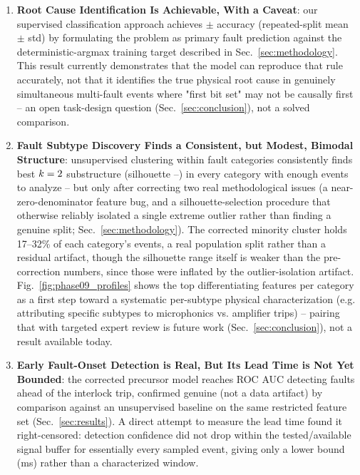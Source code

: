 \begin{enumerate}
    \item \textbf{Root Cause Identification Is Achievable, With a Caveat}: our supervised classification approach achieves \MetricZeroEightPhaseThreeaRootcauseStabilityAccuracyMean$\pm$\MetricZeroEightPhaseThreeaRootcauseStabilityAccuracyStd{} accuracy (repeated-split mean $\pm$ std) by formulating the problem as primary fault prediction against the deterministic-argmax training target described in Sec.~\ref{sec:methodology}. This result currently demonstrates that the model can reproduce that rule accurately, not that it identifies the true physical root cause in genuinely simultaneous multi-fault events where "first bit set" may not be causally first -- an open task-design question (Sec.~\ref{sec:conclusion}), not a solved comparison.

    \item \textbf{Fault Subtype Discovery Finds a Consistent, but Modest, Bimodal Structure}: unsupervised clustering within fault categories consistently finds best $k=2$ substructure (silhouette \MetricZeroNinecEnhancedSubclassDiscoveryCavityQuenchBreakdownSilhouette--\MetricZeroNinecEnhancedSubclassDiscoveryVacuumThresholdSilhouette) in every category with enough events to analyze -- but only after correcting two real methodological issues (a near-zero-denominator feature bug, and a silhouette-selection procedure that otherwise reliably isolated a single extreme outlier rather than finding a genuine split; Sec.~\ref{sec:methodology}). The corrected minority cluster holds 17--32\% of each category's events, a real population split rather than a residual artifact, though the silhouette range itself is weaker than the pre-correction numbers, since those were inflated by the outlier-isolation artifact. %
Fig.~\ref{fig:phase09_profiles} shows the top differentiating features per category as a first step toward a systematic per-subtype physical characterization (e.g. attributing specific subtypes to microphonics vs. amplifier trips) -- pairing that with targeted expert review is future work (Sec.~\ref{sec:conclusion}), not a result available today.

    \item \textbf{Early Fault-Onset Detection is Real, But Its Lead Time is Not Yet Bounded}: the corrected precursor model reaches \MetricZeroFivePhaseZeroPrecursorRandomForestRocAuc{} ROC AUC detecting faults ahead of the interlock trip, confirmed genuine (not a data artifact) by comparison against an unsupervised baseline on the same restricted feature set (Sec.~\ref{sec:results}). A direct attempt to measure the lead time found it right-censored: detection confidence did not drop within the tested/available signal buffer for essentially every sampled event, giving only a lower bound (\MetricZeroFivePrecursorLeadTimeLeadTimeMsLowerBoundMeanCensored{}ms) rather than a characterized window.


\end{enumerate}
